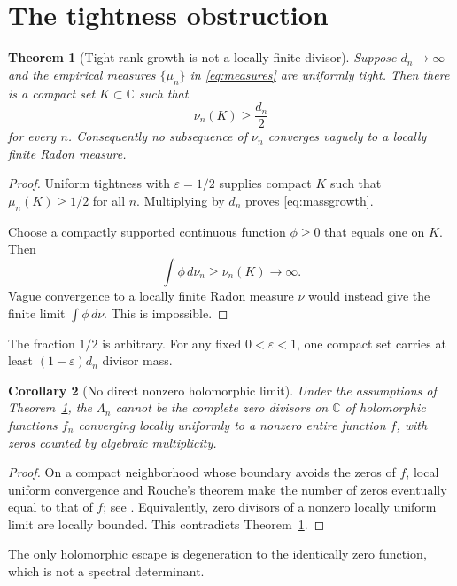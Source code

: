 \documentclass[11pt]{article}
\newtheorem{theorem}{Theorem}[section]
\newtheorem{corollary}[theorem]{Corollary}
\theoremstyle{remark}\newtheorem{remark}[theorem]{Remark}
\newcommand{\C}{\mathbb C}
\begin{document}
\section{The tightness obstruction}

\begin{theorem}[Tight rank growth is not a locally finite divisor]
\label{thm:obstruction}
Suppose $d_n\to\infty$ and the empirical measures $\{\mu_n\}$ in
\eqref{eq:measures} are uniformly tight. Then there is a compact set
$K\subset\C$ such that
\begin{equation}\label{eq:massgrowth}
 \nu_n(K)\ge\frac{d_n}{2}
\end{equation}
for every $n$. Consequently no subsequence of $\nu_n$ converges vaguely to a
locally finite Radon measure.
\end{theorem}
\begin{proof}
Uniform tightness with $\varepsilon=1/2$ supplies compact $K$ such that
$\mu_n(K)\ge1/2$ for all $n$. Multiplying by $d_n$ proves
\eqref{eq:massgrowth}.

Choose a compactly supported continuous function $\phi\ge0$ that equals one
on $K$. Then
\[
 \int\phi\,d\nu_n\ge\nu_n(K)\longrightarrow\infty.
\]
Vague convergence to a locally finite Radon measure $\nu$ would instead give
the finite limit $\int\phi\,d\nu$. This is impossible.
\end{proof}

The fraction $1/2$ is arbitrary. For any fixed
$0<\varepsilon<1$, one compact set carries at least
$(1-\varepsilon)d_n$ divisor mass.

\begin{corollary}[No direct nonzero holomorphic limit]\label{cor:holo}
Under the assumptions of Theorem~\ref{thm:obstruction}, the $\Lambda_n$
cannot be the complete zero divisors on $\C$ of holomorphic functions
$f_n$ converging locally uniformly to a nonzero entire function $f$, with
zeros counted by algebraic multiplicity.
\end{corollary}
\begin{proof}
On a compact neighborhood whose boundary avoids the zeros of $f$, local
uniform convergence and Rouche's theorem make the number of zeros eventually
equal to that of $f$; see \citet{Conway1978}. Equivalently, zero divisors of a
nonzero locally uniform limit are locally bounded. This contradicts
Theorem~\ref{thm:obstruction}.
\end{proof}

The only holomorphic escape is degeneration to the identically zero function,
which is not a spectral determinant.
\end{document}
